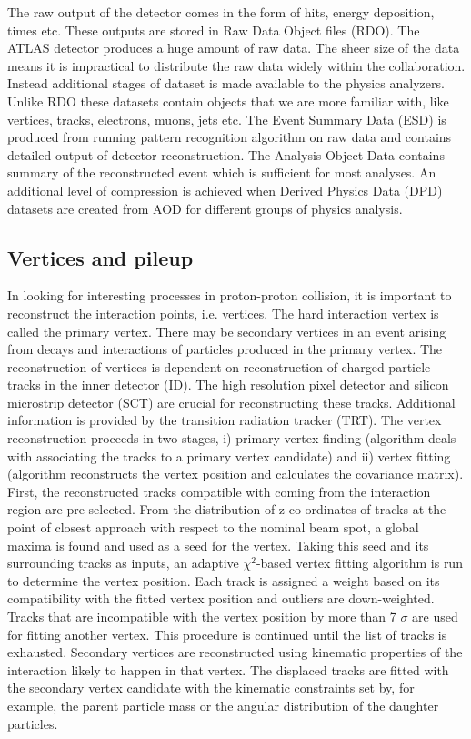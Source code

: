 The raw output of the detector comes in the form of hits, energy deposition, times etc. These outputs are stored in Raw Data Object files (RDO). The ATLAS detector produces a huge amount of raw data. The sheer size of the data means it is impractical to distribute the raw data widely within the collaboration. Instead additional stages of dataset is made available to the physics analyzers. Unlike RDO these datasets contain objects that we are more familiar with, like vertices, tracks, electrons, muons, jets etc. The Event Summary Data (ESD) is produced from running pattern recognition algorithm on raw data and contains detailed output of detector reconstruction. The Analysis Object Data contains summary of the reconstructed event which is sufficient for most analyses. An additional level of compression is achieved when Derived Physics Data (DPD) datasets are created from AOD for different groups of physics analysis. 

\subsection{Vertices and pileup}
In looking for interesting processes in proton-proton collision, it is important to reconstruct the interaction points, i.e. vertices. The hard interaction vertex is called the primary vertex. There may be secondary vertices in an event arising from decays and interactions of particles produced in the primary vertex.
The reconstruction of vertices is dependent on reconstruction of charged particle tracks in the inner detector (ID). 
The high resolution pixel detector and silicon microstrip detector (SCT) are crucial for reconstructing these tracks. Additional information is provided by the transition radiation tracker (TRT). The vertex reconstruction proceeds in two stages, i) primary vertex finding (algorithm deals with associating the tracks to a primary vertex candidate) and ii) vertex fitting (algorithm reconstructs the vertex position and calculates the covariance matrix). First, the reconstructed tracks compatible with coming from the interaction region are pre-selected. From the distribution of z co-ordinates of tracks at the point of closest approach with respect to the nominal beam spot, a global maxima is found and used as a seed for the vertex. Taking this seed and its surrounding tracks as inputs, an adaptive $\chi^{2}$-based vertex fitting algorithm is run to determine the vertex position. Each track is assigned a weight based on its compatibility with the fitted vertex position and outliers are down-weighted. Tracks that are incompatible with the vertex position by more than 7 $\sigma$ are used for fitting another vertex. This procedure is continued until the list of tracks is exhausted.  
Secondary vertices are reconstructed using kinematic properties of the interaction likely to happen in that vertex. The displaced tracks are fitted with the secondary vertex candidate with the kinematic constraints set by, for example, the parent particle mass or the angular distribution of the daughter particles.
